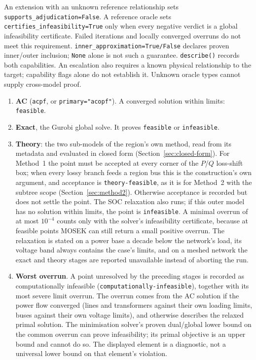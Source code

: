\documentclass[11pt,a4paper]{report}
\newcommand{\code}[1]{\texttt{\small #1}}
\begin{document}
An extension with an unknown reference relationship sets
\code{supports\_adjudication=False}. A reference oracle sets
\code{certifies\_infeasibility=True} only when every negative verdict is a
global infeasibility certificate. Failed iterations and locally converged
overruns do not meet this requirement.
\code{inner\_approximation=True/False} declares proven inner/outer inclusion;
\code{None} alone is not such a guarantee. \code{describe()} records both
capabilities. An escalation also requires a known physical relationship to the
target; capability flags alone do not establish it. Unknown oracle types
cannot supply cross-model proof.

\begin{enumerate}
\item \textbf{AC} (\code{acpf}, or \code{primary="acopf"}). A converged
  solution within limits: \code{feasible}.
\item \textbf{Exact}, the Gurobi global solve. It proves \code{feasible} or
  \code{infeasible}.
\item \textbf{Theory}: the two sub-models of the region's own method, read
  from its metadata and evaluated in closed form
  (Section~\ref{sec:closed-form}). For Method~1 the point must be accepted
  at every corner of the $P$/$Q$ loss-shift box; when every lossy branch
  feeds a region bus this is the construction's own argument, and
  acceptance is \code{theory-feasible}, as it is for Method~2 with the subtree
  scope (Section~\ref{sec:method2}). Otherwise acceptance is recorded but
  does not settle the point. The SOC
  relaxation also runs; if this outer model has no solution within
  limits, the point is \code{infeasible}. A minimal overrun of at most
  $10^{-4}$ counts only with the solver's infeasibility certificate, because at
  feasible points MOSEK can still return a small positive overrun. The
  relaxation is stated on a power base a decade below the network's load, its voltage band
  always contains the case's limits, and on a meshed network the exact and
  theory stages are reported unavailable instead of aborting the run.
\item \textbf{Worst overrun}. A point unresolved by the preceding stages is recorded
  as computationally infeasible (\code{computationally-infeasible}), together
  with its most severe limit overrun. The overrun comes from the AC solution if the power flow converged
  (lines and transformers against their own loading limits, buses against their own voltage limits),
  and otherwise describes the relaxed primal solution. The minimisation
  solver's proven dual/global lower bound on the common overrun can prove
  infeasibility; its primal objective is an upper bound and cannot do so.
  The displayed element is a diagnostic, not a universal lower bound on that
  element's violation.
\end{enumerate}
\end{document}
